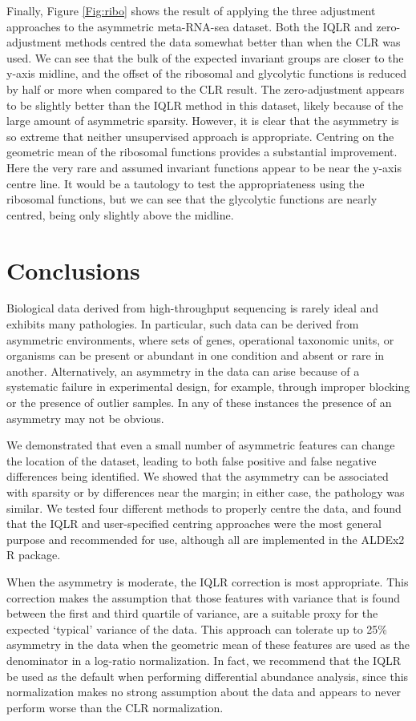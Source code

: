\documentclass[10pt]{article}
\begin{document}
Finally, Figure \ref{Fig:ribo} shows the result of applying the three adjustment approaches to the asymmetric meta-RNA-sea dataset. Both the IQLR and zero-adjustment methods centred the data somewhat better than when the CLR was used. We can see that the bulk of the expected invariant groups are closer to the y-axis midline, and the offset of the ribosomal and glycolytic functions is reduced by half or more when compared to the CLR result. The zero-adjustment  appears to be slightly better than the IQLR method in this dataset, likely because of the large amount of asymmetric sparsity. However, it is clear that the asymmetry is so extreme that neither unsupervised approach is appropriate. Centring on the geometric mean of the ribosomal functions provides a substantial improvement. Here the very rare and assumed invariant functions appear to be near the y-axis centre line. It would be a tautology to test the appropriateness using the ribosomal functions, but we can see that the glycolytic functions are nearly centred, being only slightly above the midline.

\section{Conclusions}
\vskip-0.25cm

Biological data derived from high-throughput sequencing is rarely ideal and exhibits many pathologies. In particular, such data can be derived from asymmetric environments, where sets of genes, operational taxonomic units, or organisms can be present or abundant in one condition and absent or rare in another. Alternatively, an asymmetry in the data can arise because of a systematic failure in experimental design, for example, through improper blocking or the presence of outlier samples. In any of these instances the presence of an asymmetry may not be obvious. 

We demonstrated that even a small number of asymmetric features can change the location of the dataset, leading to both false positive and false negative differences being identified. We showed that the asymmetry can be associated with sparsity or by differences near the margin; in either case, the pathology was similar. We tested four different methods to properly centre the data, and found that the IQLR and user-specified centring approaches were the most general purpose and recommended for use, although all are implemented in the ALDEx2 R package. 

When the asymmetry is moderate, the IQLR correction is most appropriate. This correction makes the assumption that those features with variance that is found between the first and third quartile of variance, are a suitable proxy for the expected `typical' variance of the data. This approach can tolerate up to 25\% asymmetry in the data when the geometric mean of these features are used as the denominator in a log-ratio normalization. In fact, we recommend that the IQLR be used as the default when performing differential abundance analysis, since this normalization makes no strong assumption about the data and appears to never perform worse than the CLR normalization.
\end{document}

